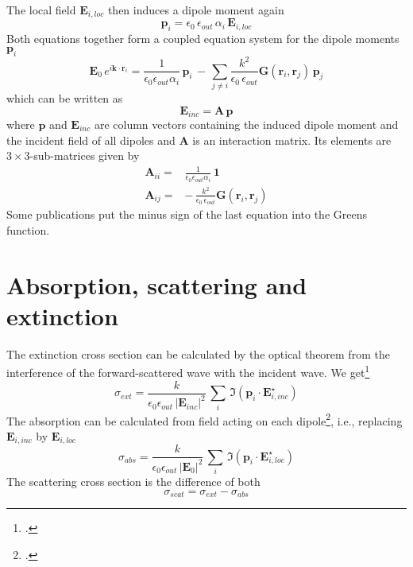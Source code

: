 The local field $\mathbf{E}_{i, loc}$ then induces a dipole moment again 
\begin{equation}
\mathbf{p}_i = \epsilon_0 \, \epsilon_{out} \, \alpha_i \, \mathbf{E}_{i,loc}
\end{equation}
Both equations together form a coupled equation system for the 
 dipole moments $ \mathbf{p}_i$
\begin{equation}
\mathbf{E}_{0} \, e^{i \mathbf{k} \cdot \mathbf{r}_i} =
\frac{1}{\epsilon_0 \epsilon_{out} \alpha_i} \, \mathbf{p}_i 
 \,  - \, 
 \sum_{j \neq i} \frac{k^2}{\epsilon_0 \, \epsilon_{out}} 
 \mathbf{G}(\mathbf{r}_i, \mathbf{r}_j)  \, \mathbf{p}_j 
\end{equation} 
 which can be written as
 \begin{equation}
 \mathbf{E}_{inc} = \mathbf{A} \, \mathbf{p}
 \end{equation}
 where $\mathbf{p}$ and $ \mathbf{E}_{inc} $ are column vectors containing the induced dipole moment and the incident field of all dipoles and $\mathbf{A} $ is an interaction matrix. Its elements are $3 \times 3$-sub-matrices given by
 \begin{align}
 \mathbf{A}_{ii} = &\frac{1}{\epsilon_0 \epsilon_{out} \alpha_i} \, \mathbf{1} \\
 \mathbf{A}_{ij} = & - \, 
 \frac{k^2}{\epsilon_0 \, \epsilon_{out}} 
 \mathbf{G}(\mathbf{r}_i, \mathbf{r}_j) 
 \end{align}
Some publications put the minus sign of the last equation into the Greens function. 

\section{Absorption, scattering and extinction} 
 
The extinction cross section can be calculated by the optical theorem from the interference of the forward-scattered wave with the incident wave. We get\footcite{Draine88,Yurkin07}
\begin{equation}
\sigma_{ext} = \frac{k}{\epsilon_0 \epsilon_{out}  \, |\mathbf{E}_{inc}|^2} \, \sum_i \, \Im ( \mathbf{p}_i \cdot \mathbf{E}_{i, inc}^\star )
\end{equation}
 The absorption can be calculated from field acting on each dipole\footcite{Yurkin07}, i.e., replacing $\mathbf{E}_{i, inc} $ by $\mathbf{E}_{i, loc} $ 
 \begin{equation}
\sigma_{abs} = \frac{k}{\epsilon_0 \epsilon_{out}  \, |\mathbf{E}_{0}|^2} \, \sum_i \, \Im ( \mathbf{p}_i \cdot \mathbf{E}_{i, loc}^\star )
\end{equation}
The scattering cross section is the difference of both
\begin{equation}
\sigma_{scat} = \sigma_{ext}  - \sigma_{abs}
\end{equation}
 
